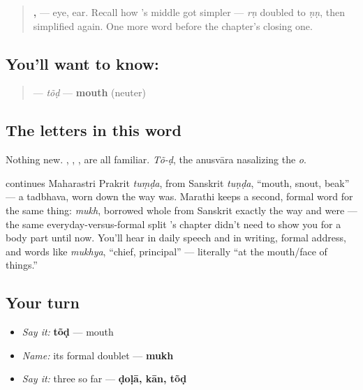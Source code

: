 \begin{quote}
\textbf{, } — eye, ear. Recall how \textbf{}'s middle got simpler — \emph{rṇ} doubled to \emph{ṇṇ}, then simplified again. One more word before the chapter's closing one.
\end{quote}

\subsection*{You'll want to know: }
\begin{quote}
\textbf{} — \emph{tõḍ} — \textbf{mouth} (neuter)
\end{quote}

\subsection*{The letters in this word}
Nothing new. \textbf{}, \textbf{}, \textbf{}, \textbf{} are all familiar. \emph{Tõ-ḍ}, the anusvāra nasalizing the \emph{o}.

\begin{cousinweb}
\textbf{} continues Maharastri Prakrit \textbf{} \emph{tuṃḍa}, from Sanskrit \textbf{} \emph{tuṇḍa}, \textquotedblleft{}mouth, snout, beak\textquotedblright{} — a tadbhava, worn down the way \textbf{} was. Marathi keeps a second, formal word for the same thing: \textbf{} \emph{mukh}, borrowed whole from Sanskrit exactly the way \textbf{} and \textbf{} were — the same everyday-versus-formal split \textbf{}'s chapter didn't need to show you for a body part until now. You'll hear \textbf{} in daily speech and \textbf{} in writing, formal address, and words like \emph{mukhya}, \textquotedblleft{}chief, principal\textquotedblright{} — literally \textquotedblleft{}at the mouth/face of things.\textquotedblright{}
\end{cousinweb}

\subsection*{Your turn}
\begin{itemize}
\raggedright
  \item \emph{Say it:} \textbf{tõḍ} — mouth
  \item \emph{Name:} its formal doublet — \textbf{mukh}
  \item \emph{Say it:} three so far — \textbf{ḍoḷā, kān, tõḍ}
\end{itemize}

